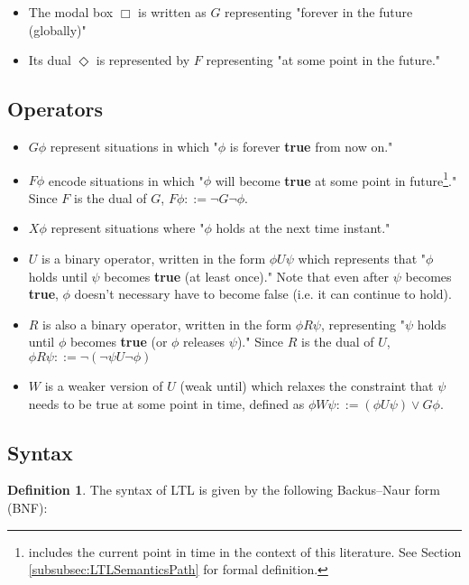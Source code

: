 \documentclass{article}
\theoremstyle{plain}
\theoremstyle{definition}
\newtheorem{defn}[thm]{Definition} %
\begin{document}
\begin{multicols}{2}
\begin{itemize}
\item The modal box $\Box$ is written as $G$ representing "forever in the future (globally)"
\item Its dual $\Diamond$ is represented by $F$ representing "at some point in the future."
\end{itemize}

\subsection{Operators}

\begin{itemize}
\item $G\phi$ represent situations in which "$\phi$ is forever \textbf{true} from now on."
\item $F\phi$ encode situations in which "$\phi$ will become \textbf{true} at some point in future\footnote{includes the current point in time in the context of this literature. See Section \ref{subsubsec:LTLSemanticsPath} for formal definition.}." Since $F$ is the dual of $G$, $F\phi ::= \lnot G\lnot\phi$.
\item $X\phi$ represent situations where "$\phi$ holds at the next time instant."
\item $U$ is a binary operator, written in the form $\phi U \psi$ which represents that "$\phi$ holds until $\psi$ becomes \textbf{true} (at least once)." Note that even after $\psi$ becomes \textbf{true}, $\phi$ doesn't necessary have to become false (i.e. it can continue to hold).
\item $R$ is also a binary operator, written in the form $\phi R \psi$, representing "$\psi$ holds until $\phi$ becomes \textbf{true} (or $\phi$ releases $\psi$)." Since $R$ is the dual of $U$, $\phi R \psi ::= \lnot(\lnot\psi U\lnot\phi)$
\item $W$ is a weaker version of $U$ (weak until) which relaxes the constraint that $\psi$ needs to be true at some point in time, defined as $\phi W\psi ::= (\phi U \psi)\lor G\phi$.
\end{itemize}

\subsection{Syntax}

\begin{defn}The syntax of LTL is given by the following Backus–Naur form (BNF):\end{defn}


\end{multicols}
\end{document}
